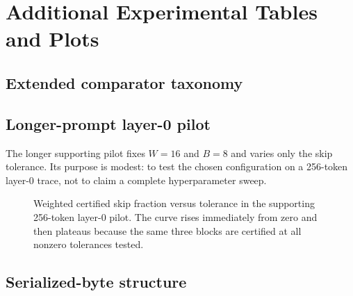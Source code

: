 \section{Additional Experimental Tables and Plots}
\label{app:extended}

\subsection{Extended comparator taxonomy}



\subsection{Longer-prompt layer-0 pilot}

The longer supporting pilot fixes \(W=16\) and \(B=8\) and varies only the skip tolerance. Its purpose is modest: to test the chosen configuration on a 256-token layer-0 trace, not to claim a complete hyperparameter sweep.

\begin{table}[h]
  \centering
  \small
  
  \caption{Supporting 256-token layer-0 pilot across four tolerances. Certified skips appear only at nonzero tolerances, and the skip fraction remains small.}
  \label{tab:pilot}
\end{table}

\begin{figure}[h]
  \centering
  
  \caption{Weighted certified skip fraction versus tolerance in the supporting 256-token layer-0 pilot. The curve rises immediately from zero and then plateaus because the same three blocks are certified at all nonzero tolerances tested.}
  \label{fig:skipvstol}
\end{figure}

\subsection{Serialized-byte structure}

\begin{table}[h]
  \centering
  \small
  
  \caption{Mean serialized-byte breakdown in the representative-layer benchmark. Metadata overhead explains why RACK-KV uses slightly more bytes than uniform INT8 even though its reconstruction error is lower.}
  \label{tab:storagebreakdown}
\end{table}


